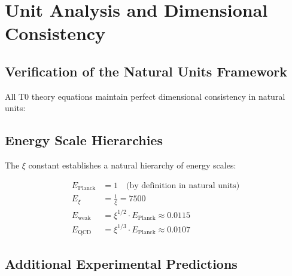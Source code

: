 	\section{Unit Analysis and Dimensional Consistency}
	
	\subsection{Verification of the Natural Units Framework}
	
	All T0 theory equations maintain perfect dimensional consistency in natural units:
	
	\begin{table}[h]
		\centering
		\caption{Dimensional consistency in natural units}
	\end{table}
	
	\subsection{Energy Scale Hierarchies}
	
	The $\xi$ constant establishes a natural hierarchy of energy scales:
	
	\begin{align}
		E_{\text{Planck}} &= 1 \quad \text{(by definition in natural units)} \\
		E_\xi &= \frac{1}{\xi} = 7500 \\
		E_{\text{weak}} &= \xi^{1/2} \cdot E_{\text{Planck}} \approx 0.0115 \\
		E_{\text{QCD}} &= \xi^{1/3} \cdot E_{\text{Planck}} \approx 0.0107
	\end{align}
	
	\subsection{Additional Experimental Predictions}
	
